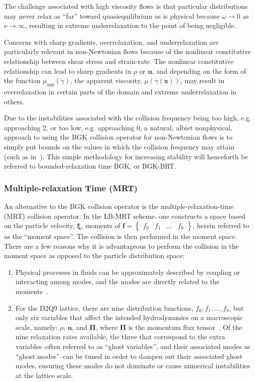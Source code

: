\documentclass[pdftex,ms]{pittetd}
\newcommand{\pos}{\mathbf{x}}
\newcommand{\pvel}{\boldsymbol{\xi}}
\newcommand{\mvel}{\mathbf{u}}
\begin{document}
The challenge associated with high viscosity flows is that particular distributions may never relax as ``far'' toward quasiequilibrium as is physical because $\omega \rightarrow 0$ as $\nu \rightarrow \infty$, resulting in extreme underrelaxation to the point of being negligible. %

Concerns with sharp gradients, overrelaxation, and underrelaxation are particularly relevant in non-Newtonian flows because of the nonlinear constitutive relationship between shear stress and strain-rate.
The nonlinear constitutive relationship can lead to sharp gradients in $\rho$ or $\mvel$, and depending on the form of the function $\mu_{app}(\dot{\gamma})$, the apparent viscosity, $\mu(\dot{\gamma}(\pos))$, may result in overrelaxation in certain parts of the domain and extreme underrelaxation in others.

Due to the instabilities associated with the collision frequency being too high, e.g. approaching 2, or too low, e.g. approaching 0, a natural, albiet nonphysical, approach to using the BGK collision operator for non-Newtonian flows is to simply put bounds on the values in which the collision frequency may attain (such as in~\citet{svec2011flow,svec2012free,gabbanelli2005lattice}).
This simple methodology for increasing stability will henceforth be referred to bounded-relaxation time BGK, or BGK-BRT.

\subsubsection{Multiple-relaxation Time (MRT)}

An alternative to the BGK collision operator is the multiple-relaxation-time (MRT) collision operator.
In the LB-MRT scheme, one constructs a space based on the particle velocity, $\pvel$, moments of $\mathbf{f} = \begin{Bmatrix}f_0 & f_1 & ... & f_8\end{Bmatrix}$, herein referred to as the ``moment space''.
The collision is then performed in the moment space.
There are a few reasons why it is advantageous to perform the collision in the moment space as opposed to the particle distribution space:
\begin{enumerate}
    \item Physical processes in fluids can be approximately described by coupling or interacting among modes, and the modes are directly related to the moments~\cite{lallemand2000theory}.
    \item For the D2Q9 lattice, there are nine distribution functions, $f_0, f_1, ..., f_8$, but only six variables that affect the intended hydrodynamics on a macroscopic scale, namely: $\rho$, $\mathbf{u}$, and $\mathbf{\Pi}$, where $\mathbf{\Pi}$ is the momentum flux tensor~\cite{dellar2003incompressible}.
    Of the nine relaxation rates available, the three that correspond to the extra variables--often referred to as ``ghost variables'', and their associated modes as ``ghost modes''--can be tuned in order to dampen out their associated ghost modes, ensuring these modes do not dominate or cause numerical instabilities at the lattice scale.
\end{enumerate}
\end{document}
